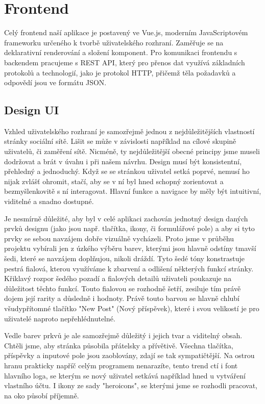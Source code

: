 \section{Frontend}

Celý frontend naší aplikace je postavený ve Vue.js, moderním
JavaScriptovém frameworku určeného k tvorbě uživatelského rozhraní.
Zaměřuje se na deklarativní renderování a složení komponent.
Pro komunikaci frontendu s backendem pracujeme s REST API, který
pro přenos dat využívá základních protokolů a technologií, jako je
protokol HTTP, přičemž těla požadavků a odpovědí jsou ve formátu JSON.

\subsection{Design UI}

Vzhled uživatelského rozhraní je samozřejmě jednou z nejdůležitějších
vlastností stránky sociální sítě. Lišit se může v závislosti například
na cílové skupině uživatelů, či zaměření sítě. Nicméně, ty nejdůležitější 
obecné principy jsme museli dodržovat a brát v úvahu i při našem návrhu.
Design musí být konsistentní, přehledný a jednoduchý. Když se se stránkou
uživatel setká poprvé, nemusí ho nijak zvlášť ohromit, stačí, aby se v ní
byl hned schopný zorientovat a bezmyšlenkovitě s ní interagovat. Hlavní
funkce a navigace by měly být intuitivní, viditelné a snadno dostupné. 

Je nesmírně důležité, aby byl v celé aplikaci zachován jednotný design 
daných prvků designu (jako jsou např. tlačítka, ikony, či formulářové pole)
a aby si tyto prvky se sebou navzájem dobře vizuálně vycházeli. Proto jsme
v průběhu projektu vybírali jen z úzkého výběru barev, kterými jsou hlavně 
odstíny tmavší šedi, které se navzájem doplňujou, nikoli dráždí. Tyto šedé
tóny konstrastuje pestrá fialová, kterou využíváme k zbarvení a odlišení 
některých funkcí stránky. Křiklavý rozpor šedého pozadí a fialových
detailů uživateli poukazuje na důležitost těchto funkcí. Touto fialovou se
rozhodně šetří, zesiluje tím právě dojem její rarity a důsledně i hodnoty.
Právě touto barvou se hlavně chlubí všudypřítomné tlačítko "New Post" 
(Nový příspěvek), které i svou velikostí je pro uživatelé naproto
nepřehlédnutelné.

Vedle barev prkvů je ale samozřejmě důležitý i jejich tvar a viditelný obsah.
Chtěli jsme, aby stránka působila přátelsky a přívětivě. Všechna tlačítka,
příspěvky a inputové pole jsou zaoblovány, zdají se tak sympatičtější. Na 
ostrou hranu prakticky napříč celým programem nenarazíte, tento trend ctí
i font hlavního loga, se kterým se nový uživatel setkává například hned u
vytváření vlastního účtu. I ikony ze sady "heroicons", se kterými jsme se
rozhodli pracovat, na oko působí příjemně.

